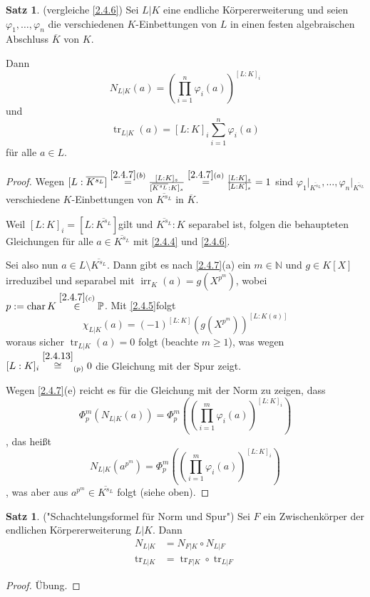 \documentclass[
twoside=semi,
fontsize=12,
DIV=12, 
cleardoublepage=current,
leqno,
headings=optiontoheadandtoc, 
toc=idx
]{scrbook}
\newcommand{\N}{\mathbb{N}}
\renewcommand{\P}{\mathbb{P}}
\newcommand{\brac}[1]{\left( #1 \right)}
\DeclareMathOperator{\irr}{irr}
\DeclareMathOperator{\tr}{tr}
\DeclareMathOperator{\Char}{char}
\theoremstyle{definition}
\newtheorem{satz}[definition]{Satz}
\begin{document}
	\begin{satz}\label{2.4.14}
		(vergleiche \ref{2.4.6})\newline
		Sei $L|K$ eine endliche K\"orpererweiterung und seien $\varphi_1, \dots, \varphi_n$ die verschiedenen $K$-Einbettungen von $L$ in einen festen algebraischen Abschluss $\overline{K}$ von $K$.
		
		Dann 
			\[N_{L|K}(a) = \brac{\prod_{i=1}^n \varphi_i(a)}^{[L:K]_i} \]
		und
			\[\tr_{L|K}(a) = [L:K]_i \sum_{i=1}^n\varphi_i(a)\]
		f\"ur alle $a \in L$.
		
		\begin{proof}
			Wegen $[L: \overline{K^{s_L}}] \overset{\ref{2.4.7}(b)}{=} \frac{[L:K]_s}{[\overline{K^{s_L}}:K]_s} \overset{\ref{2.4.7}(a)}{=} \frac{[L:K]_s}{[L:K]_s} = 1$ sind 
			$\varphi_1\big|_{\overline{K^{s_L}}}, \dots, \varphi_n\big|_{\overline{K^{s_L}}}$ verschiedene $K$-Einbettungen von $\overline{K^{s_L}}$ in $\overline{K}$.
			
			Weil $[L:K]_i = [L:\overline{K^{s_L}}]$gilt und $\overline{K^{s_L}}:K$ separabel ist, folgen die behaupteten Gleichungen f\"ur alle $a \in \overline{K^{s_L}}$ mit \ref{2.4.4} und \ref{2.4.6}.
			
			Sei also nun $a \in L \setminus \overline{K^{s_L}}$. Dann gibt es nach \ref{2.4.7}(a) ein $m \in \N$ und $g \in K[X]$ irreduzibel und separabel mit $\irr_K(a) = g(X^{p^m})$, wobei $p:= \Char K \overset{\ref{2.4.7}(c)}{\in} \P$. Mit \ref{2.4.5}folgt 
				\[\chi_{L|K}(a) = (-1)^{[L:K]}\brac{g(X^{p^m})}^{[L:K(a)]} \]
			woraus sicher $\tr_{L|K}(a) = 0$ folgt (beachte $m \geq 1$), was wegen $[L:K]_i \overset{\ref{2.4.13}}{\cong}_{(p)} 0$ die Gleichung mit der Spur zeigt.
			
			Wegen \ref{2.4.7}(e) reicht es f\"ur die Gleichung mit der Norm zu zeigen, dass
				\[\Phi_p^m(N_{L|K}(a)) = \Phi_p^m\brac{\brac{\prod_{i=1}^m \varphi_i(a)}^{[L:K]_i} } \],
			das hei\ss t 
				\[N_{L|K}(a^{p^m}) = \Phi_p^m\brac{\brac{\prod_{i=1}^m \varphi_i(a)}^{[L:K]_i} }\]
			, was aber aus $a^{p^m} \in \overline{K^{s_L}}$ folgt (siehe oben).
		\end{proof}
	\end{satz}

	\begin{satz}\label{2.4.15}
		("Schachtelungsformel f\"ur Norm und Spur")\newline
		Sei $F$ ein Zwischenk\"orper der endlichen K\"orpererweiterung $L|K$. Dann
			\begin{align*}
				N_{L|K} &= N_{F|K} \circ N_{L|F}\\
				\tr_{L|K} &= \tr_{F|K} \circ \tr_{L|F}
			\end{align*}
		\begin{proof}
			\"Ubung.
		\end{proof}
	\end{satz}
\end{document}
